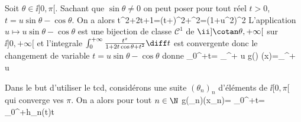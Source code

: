 \xsol
Soit $\theta\in\ii]0,\pi[$. Sachant que $\sin\theta\ne0$ on peut poser pour tout réel $t>0$, $t=u\sin\theta-\cos\theta$. On a alors
    \<t^2+2t\cos\theta+1=(t+\cos\theta)^2+\sin^2\theta=(1+u^2)\sin^2\theta\>
L'application $u\longmapsto u\sin\theta-\cos\theta$ est une bijection de classe $\mathcal C^1$ de $\ii]\cotan\theta,+\infty[$ sur $\ii]0,+\infty[$ et l'integrale $\int_{0}^{+\infty}\frac{t^x}{1+2t\cos\theta+t^2}\diff t$ est convergente donc le changement de variable $t=u\sin\theta-\cos\theta$ donne
\<
\int_{0}^{+\infty}\diff t=
\int_{\xcotan \theta}^{+\infty}  \diff  u
\>
\<
    g(\theta) \sin (\theta x)=\int_{\xcotan \theta}^{+\infty}  \diff  u
\>

\xsol
    Dans le but d'utiliser le \ac{tcd}, considérons une suite $(\theta_n)_n$ d'éléments de $\ii[0,\pi[$ qui converge ves $\pi$. On a alors pour tout $n\in\N$
    \<
        g(\theta_n)\sin(x\theta_n)=
        \int_{0}^{+\infty}\diff t=
        \int_{0}^{+\infty}h_n(t)\diff t
    \>
